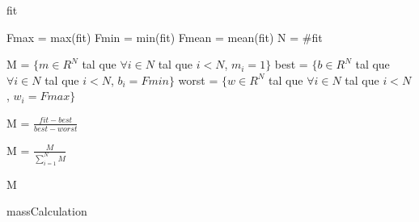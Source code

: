 \documentclass{article}
\begin{document}
\begin{algorithm}
\begin{algorithmic}[1]
    \REQUIRE fit

    \STATE Fmax = max(fit)
    \STATE Fmin = min(fit)
    \STATE Fmean = mean(fit)
    \STATE N = \#fit

        \STATE M = $\{m \in R^{N}$ tal que $\forall i \in N$ tal que $i < N$, $m_{i} = 1\}$
    \ELSE
        \STATE best = $\{b \in R^{N}$ tal que $\forall i \in N$ tal que $i < N$, $b_{i} = Fmin\}$
        \STATE worst = $\{w \in R^{N}$ tal que $\forall i \in N$ tal que $i < N$, $w_{i} = Fmax\}$

        \STATE M = $\frac{fit - best}{best - worst}$
    \ENDIF

    M = $\frac{M}{\sum_{i=1}^N M}$

    \RETURN M
\end{algorithmic}
\caption{massCalculation}
\end{algorithm}
 
\end{document}
